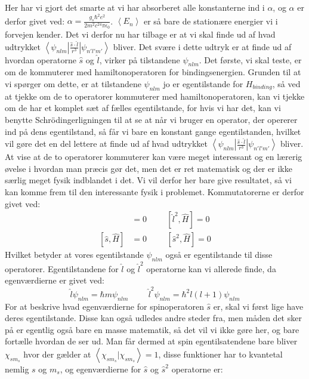 \documentclass[../../Atom-ogMolekylefysik.tex]{subfiles}
\begin{document}
Her har vi gjort det smarte at vi har absorberet alle konstanterne ind i $\alpha$, og $\alpha$ er derfor givet ved: $\alpha=\frac{g_s\hbar^2e^2}{2m^2c^24\pi\epsilon_0}$. $\left<E_n\right>$ er så bare de stationære energier vi i forvejen kender. Det vi derfor nu har tilbage er at vi skal finde ud af hvad udtrykket $\left<\psi_{nlm}\right|\frac{\hat{s}\cdot\hat{l}}{r^3}\left|\psi_{n'l'm'}\right>$ bliver. Det svære i dette udtryk er at finde ud af hvordan operatorne $\hat{s}$ og $\hat{l}$, virker på tilstandene $\psi_{nlm}$. Det første, vi skal teste, er om de kommuterer med hamiltonoperatoren for bindingsenergien. Grunden til at vi spørger om dette, er at tilstandene $\psi_{nlm}$ jo er egentilstande for $H_{binding}$, så ved at tjekke om de to operatorer kommuterer med hamiltonoperatoren, kan vi tjekke om de har et komplet sæt af fælles egentilstande, for hvis vi har det, kan vi benytte Schrödingerligningen til at se at når vi bruger en operator, der opererer ind på dens egentilstand, så får vi bare en konstant gange egentilstanden, hvilket vil gøre det en del lettere at finde ud af hvad udtrykket $\left<\psi_{nlm}\right|\frac{\hat{s}\cdot\hat{l}}{r^3}\left|\psi_{n'l'm'}\right>$ bliver.\\
At vise at de to operatorer kommuterer kan være meget interessant og en lærerig øvelse i hvordan man præcis gør det, men det er ret matematisk og der er ikke særlig meget fysik indblandet i det. Vi vil derfor her bare give resultatet, så vi kan komme frem til den interessante fysik i problemet. Kommutatorerne er derfor givet ved:
\begin{align}
    [\hat{l},\hat{H}]&=0 \hspace{1cm}[\hat{l}^2,\hat{H}]=0\\
    [\hat{s},\hat{H}]&=0 \hspace{1cm}[\hat{s}^2,\hat{H}]=0
\end{align}
Hvilket betyder at vores egentilstande $\psi_{nlm}$ også er egentilstande til disse operatorer. Egentilstandene for $\hat{l}$ og $\hat{l}^2$ operatorne kan vi allerede finde, da egenværdierne er givet ved: 
\begin{equation}
   \hat{l}\psi_{nlm}=\hbar m\psi_{nlm} \hspace{1cm}\hat{l}^2\psi_{nlm}=\hbar^2l(l+1)\psi_{nlm} 
\end{equation}
For at beskrive hvad egenværdierne for spinoperatoren $\hat{s}$ er, skal vi først lige have deres egentilstande. Disse kan også udledes andre steder fra, men måden det sker på er egentlig også bare en masse matematik, så det vil vi ikke gøre her, og bare fortælle hvordan de ser ud. Man får dermed at spin egentilsatendene bare bliver $\chi_{sm_s}$ hvor der gælder at $\left<\chi_{sm_s}|\chi_{sm_s}\right>=1$, disse funktioner har to kvantetal nemlig $s$ og $m_s$, og egenværdierne for $\hat{s}$ og $\hat{s}^2$ operatorne er:
\end{document}
